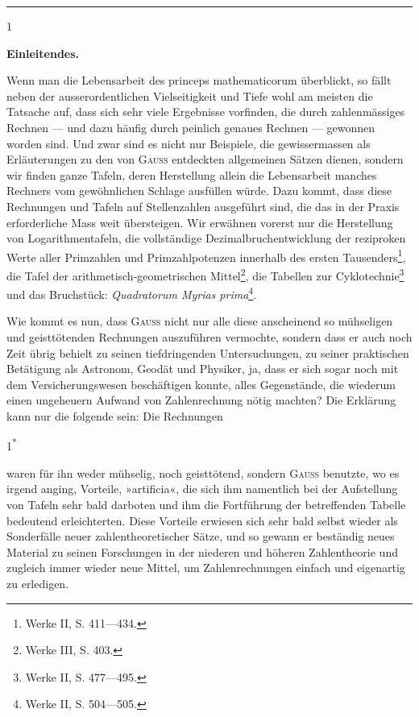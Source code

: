 \noindent\rule{\textwidth}{.3pt}\par
\vspace{.7in}\hfill{\small 1}\par
\clearpage\NoSourceHead{}
\renewcommand{\thefootnote}{\arabic{footnote})}\setcounter{footnote}{0}
\begin{center}{\large\bfseries Einleitendes.}\end{center}
\noindent\hspace*{\parindent}Wenn man die Lebensarbeit des princeps mathematicorum überblickt, so
fällt neben der ausserordentlichen Vielseitigkeit und Tiefe wohl am meisten
die Tatsache auf, dass sich sehr viele Ergebnisse vorfinden, die durch zahlenmässiges Rechnen — und dazu häufig durch peinlich genaues Rechnen —
gewonnen worden sind. Und zwar sind es nicht nur Beispiele, die gewissermassen als Erläuterungen zu den von \textsc{Gauss} entdeckten allgemeinen Sätzen
dienen, sondern wir finden ganze Tafeln, deren Herstellung allein die Lebensarbeit manches Rechners vom gewöhnlichen Schlage ausfüllen würde. Dazu
kommt, dass diese Rechnungen und Tafeln auf Stellenzahlen ausgeführt sind,
die das in der Praxis erforderliche Mass weit übersteigen. Wir erwähnen
vorerst nur die Herstellung von Logarithmentafeln, die vollständige Dezimalbruchentwicklung der reziproken Werte aller Primzahlen und Primzahlpotenzen
innerhalb des ersten Tausenders\footnote{Werke II, S. 411—434.}, die Tafel der arithmetisch-geometrischen
Mittel\footnote{Werke III, S. 403.}, die Tabellen zur Cyklotechnie\footnote{Werke II, S. 477—495.} und das Bruchstück: \textit{Quadratorum
Myrias prima}\footnote{Werke II, S. 504—505.}.

Wie kommt es nun, dass \textsc{Gauss} nicht nur alle diese anscheinend so mühseligen und geisttötenden Rechnungen auszuführen vermochte, sondern dass
er auch noch Zeit übrig behielt zu seinen tiefdringenden Untersuchungen, zu
seiner praktischen Betätigung als Astronom, Geodät und Physiker, ja, dass
er sich sogar noch mit dem Versicherungswesen beschäftigen konnte, alles
Gegenstände, die wiederum einen ungeheuern Aufwand von Zahlenrechnung
nötig machten? Die Erklärung kann nur die folgende sein: Die Rechnungen
\par\smallskip\noindent\hfill{\small 1\textsuperscript{*}}\par
\clearpage{}
\noindent waren für ihn weder mühselig, noch geisttötend, sondern \textsc{Gauss} benutzte, wo
es irgend anging, Vorteile, »artificia«, die sich ihm namentlich bei der Aufstellung von Tafeln sehr bald darboten und ihm die Fortführung der betreffenden Tabelle bedeutend erleichterten. Diese Vorteile erwiesen sich sehr
bald selbst wieder als Sonderfälle neuer zahlentheoretischer Sätze, und so gewann er beständig neues Material zu seinen Forschungen in der niederen und
höheren Zahlentheorie und zugleich immer wieder neue Mittel, um Zahlenrechnungen einfach und eigenartig zu erledigen.

